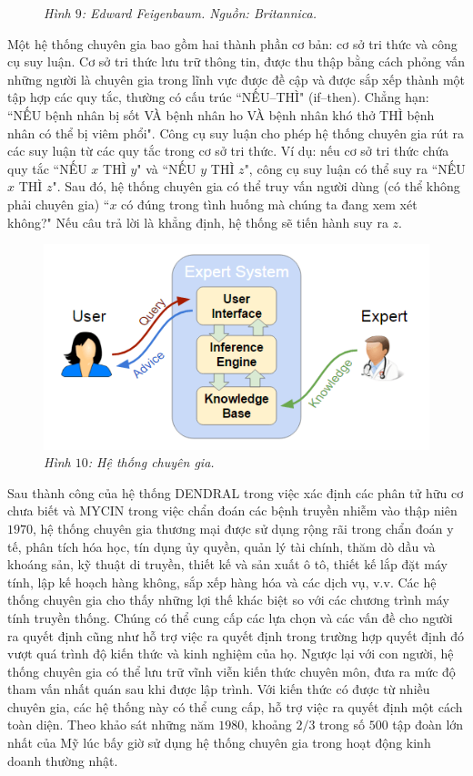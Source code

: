 \begin{multicols}{2}
\begin{figure}[H]
		\caption{\small\textit{\color{timhieukhoahoc}Hình $9$: Edward Feigenbaum. Nguồn: Britannica.}}
		\vspace*{-10pt}
	\end{figure}
	Một hệ thống chuyên gia bao gồm hai thành phần cơ bản: cơ sở tri thức và công cụ suy luận. Cơ sở tri thức lưu trữ thông tin, được thu thập bằng cách phỏng vấn những người là chuyên gia trong lĩnh vực được đề cập và được sắp xếp thành một tập hợp các quy tắc, thường có cấu trúc ``NẾU--THÌ" (if--then). Chẳng hạn: ``NẾU bệnh nhân bị sốt VÀ bệnh nhân ho VÀ bệnh nhân khó thở THÌ bệnh nhân có thể bị viêm phổi". Công cụ suy luận cho phép hệ thống chuyên gia rút ra các suy luận từ các quy tắc trong cơ sở tri thức. Ví dụ: nếu cơ sở tri thức chứa quy tắc ``NẾU $x$ THÌ $y$" và ``NẾU $y$ THÌ $z$", công cụ suy luận có thể suy ra ``NẾU $x$ THÌ $z$". Sau đó, hệ thống chuyên gia có thể truy vấn người dùng (có thể không phải chuyên gia) ``$x$ có đúng trong tình huống mà chúng ta đang xem xét không?" Nếu câu trả lời là khẳng định, hệ thống sẽ tiến hành suy ra $z$.
	\begin{figure}[H]
		\vspace*{-5pt}
		\centering
		\captionsetup{labelformat= empty, justification=centering}
		\includegraphics[width= 0.9\linewidth]{Expert_System.png}
		\caption{\small\textit{\color{timhieukhoahoc}Hình $10$: Hệ thống chuyên gia.}}
		\vspace*{-10pt}
	\end{figure}
	Sau thành công của hệ thống DENDRAL trong việc xác định các phân tử hữu cơ chưa biết và MYCIN trong việc chẩn đoán các bệnh truyền nhiễm vào thập niên $1970$, hệ thống chuyên gia thương mại được sử dụng rộng rãi trong chẩn đoán y tế, phân tích hóa học, tín dụng ủy quyền, quản lý tài chính, thăm dò dầu và khoáng sản, kỹ thuật di truyền, thiết kế và sản xuất ô tô, thiết kế lắp đặt máy tính, lập kế hoạch hàng không, sắp xếp hàng hóa và các dịch vụ, v.v. Các hệ thống chuyên gia cho thấy những lợi thế khác biệt so với các chương trình máy tính truyền thống. Chúng có thể  cung cấp các lựa chọn và các vấn đề cho người ra quyết định cũng như hỗ trợ việc ra quyết định trong trường hợp quyết định đó vượt quá trình độ kiến thức và kinh nghiệm của họ. Ngược lại với con người, hệ thống chuyên gia có thể  lưu trữ vĩnh viễn kiến thức chuyên môn, đưa ra mức độ tham vấn nhất quán sau khi được lập trình. Với kiến thức có được từ nhiều chuyên gia, các hệ thống này có thể cung cấp, hỗ trợ việc ra quyết định một cách toàn diện. Theo khảo sát những năm $1980$, khoảng $2/3$ trong số $500$ tập đoàn lớn nhất của Mỹ lúc bấy giờ sử dụng hệ thống chuyên gia trong hoạt động kinh doanh thường nhật.

\end{multicols}
